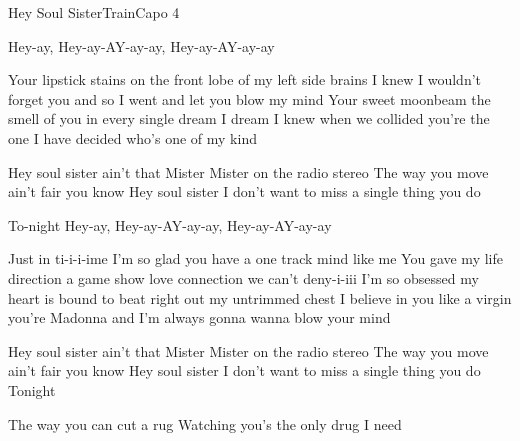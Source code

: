 \begin{song}{Hey Soul Sister}{Train}{Capo 4}

Hey-ay, Hey-ay-AY-ay-ay, Hey-ay-AY-ay-ay

Your lipstick stains   on the front lobe of my left side brains
I knew I wouldn't forget you and so I went and let you blow my mind
Your sweet moonbeam   the smell of you in every single dream I dream
I knew when we collided you're the one I have decided who's one of my kind

Hey soul sister ain't that Mister Mister on the radio stereo
The way you move ain't fair you know
Hey soul sister I don't want to miss a single thing you do

To-night Hey-ay, Hey-ay-AY-ay-ay, Hey-ay-AY-ay-ay

Just in ti-i-i-ime I'm so glad you have a one track mind like me
You gave my life direction a game show love connection we can't deny-i-iii
I'm so obsessed   my heart is bound to beat right out my untrimmed chest
I believe in you like a virgin you're Madonna and I'm always gonna wanna
blow your mind

Hey soul sister ain't that Mister Mister on the radio stereo
The way you move ain't fair you know
Hey soul sister I don't want to miss a single thing you do
Tonight

The way you can cut a rug
Watching you's the only drug I need


\end{song}
